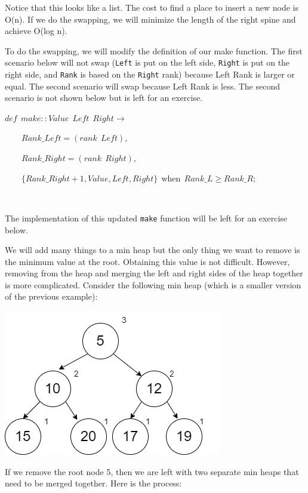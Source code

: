\documentclass[
]{book}
\begin{document}
Notice that this looks like a list. The cost to find a place to insert a new node is O(n). If we do the swapping, we will minimize the length of the right spine and achieve O(log n).

To do the swapping, we will modify the definition of our make function. The first scenario below will not swap (\texttt{Left} is put on the left side, \texttt{Right} is put on the right side, and \texttt{Rank} is based on the \texttt{Right} rank) because Left Rank is larger or equal. The second scenario will swap because Left Rank is less. The second scenario is not shown below but is left for an exercise.

\begin{formulabox}
\(\mathit{def} ~ ~ make :: Value ~ ~ \mathit{Left} ~ ~ Right \rightarrow\)

\(\quad \quad Rank\_Left = (rank ~ ~ \mathit{Left}),\)

\(\quad \quad Rank\_Right = (rank ~ ~ Right),\)

\(\quad \quad \lbrace Rank\_Right + 1, Value, \mathit{Left}, Right \rbrace ~ ~ \text{when} ~ ~ Rank\_L \geq Rank\_R;\)

\end{formulabox}

\(\nonumber\)

The implementation of this updated \texttt{make} function will be left for an exercise below.

We will add many things to a min heap but the only thing we want to remove is the minimum value at the root. Obtaining this value is not difficult. However, removing from the heap and merging the left and right sides of the heap together is more complicated. Consider the following min heap (which is a smaller version of the previous example):

\includegraphics{images/heap_del1.drawio.png}

If we remove the root node 5, then we are left with two separate min heaps that need to be merged together. Here is the process:
\end{document}
